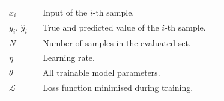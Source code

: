 %
%


\begin{longtable}{@{}p{0.15\linewidth}p{0.80\linewidth}@{}}
$x_i$ & Input of the $i$-th sample. \\
$y_i$, $\hat{y}_i$ & True and predicted value of the $i$-th sample. \\
$N$ & Number of samples in the evaluated set. \\
$\eta$ & Learning rate. \\
$\theta$ & All trainable model parameters. \\
$\mathcal{L}$ & Loss function minimised during training. \\
\end{longtable}
